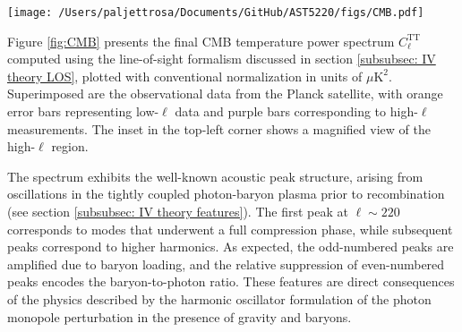 \documentclass{aa}
\numberwithin{equation}{section}
\numberwithin{table}{section}
\numberwithin{figure}{section}
\begin{document}
\begin{figure*}
  \centering
  \texttt{[image: /Users/paljettrosa/Documents/GitHub/AST5220/figs/CMB.pdf]}
  \caption{The CMB temperature power spectrum $C_\ell^\text{TT}$ (black) compared with Planck low-$\ell$ (orange) and high-$\ell$ (purple) data points. The inset highlights a zoom on the high-$\ell$ region. The first three peaks are clearly visible, and the agreement with data is overall good, though the computed peaks are slightly higher, likely due to the absence of gravitational lensing smoothing. \colorbox{Plum}{TODO: maybe change}}\label{fig:CMB}
\end{figure*}

Figure \ref{fig:CMB} presents the final CMB temperature power spectrum $C_\ell^\text{TT}$ computed using the line-of-sight formalism discussed in section \ref{subsubsec: IV theory LOS}, plotted with conventional normalization in units of $\mu\text{K}^2$. Superimposed are the observational data from the Planck satellite, with orange error bars representing low-$\ell$ data and purple bars corresponding to high-$\ell$ measurements. The inset in the top-left corner shows a magnified view of the high-$\ell$ region.

The spectrum exhibits the well-known acoustic peak structure, arising from oscillations in the tightly coupled photon-baryon plasma prior to recombination (see section \ref{subsubsec: IV theory features}). The first peak at $\ell \sim 220$ corresponds to modes that underwent a full compression phase, while subsequent peaks correspond to higher harmonics. As expected, the odd-numbered peaks are amplified due to baryon loading, and the relative suppression of even-numbered peaks encodes the baryon-to-photon ratio. These features are direct consequences of the physics described by the harmonic oscillator formulation of the photon monopole perturbation in the presence of gravity and baryons.


\end{document}
